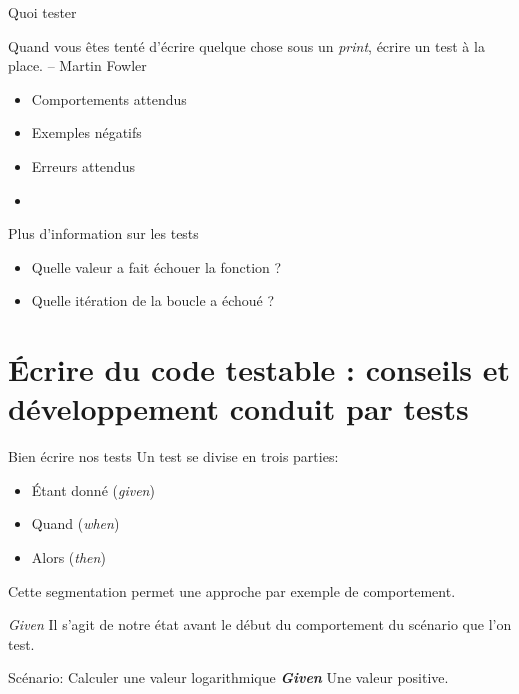 \documentclass[11pt]{beamer}
\begin{document}
\begin{frame}{Quoi tester}
\begin{block}{}
Quand vous êtes tenté d'écrire quelque chose sous un \textit{print}, écrire un test à la place. -- Martin Fowler
\end{block}
\begin{itemize}
\item Comportements attendus
\item Exemples négatifs
\item Erreurs attendus
\item
\end{itemize}
\end{frame}

\begin{frame}{Plus d'information sur les tests}
\begin{itemize}
\item Quelle valeur a fait échouer la fonction ?
\item Quelle itération de la boucle a échoué ?
\end{itemize}
\end{frame}

\section{Écrire du code testable : conseils et développement conduit par tests}

\begin{frame}{Bien écrire nos tests}
Un test se divise en trois parties:
\begin{itemize}
	\item Étant donné (\textit{given})
	\item Quand (\textit{when})
	\item Alors (\textit{then})
\end{itemize}
Cette segmentation permet une approche par exemple de comportement.

\end{frame}

\begin{frame}{\textit{Given}}
Il s'agit de notre état avant le début du comportement du scénario que l'on test.

\begin{block}{Scénario: Calculer une valeur logarithmique}
\textit{\textbf{Given}} Une valeur positive.
\end{block}
\end{frame}
\end{document}
